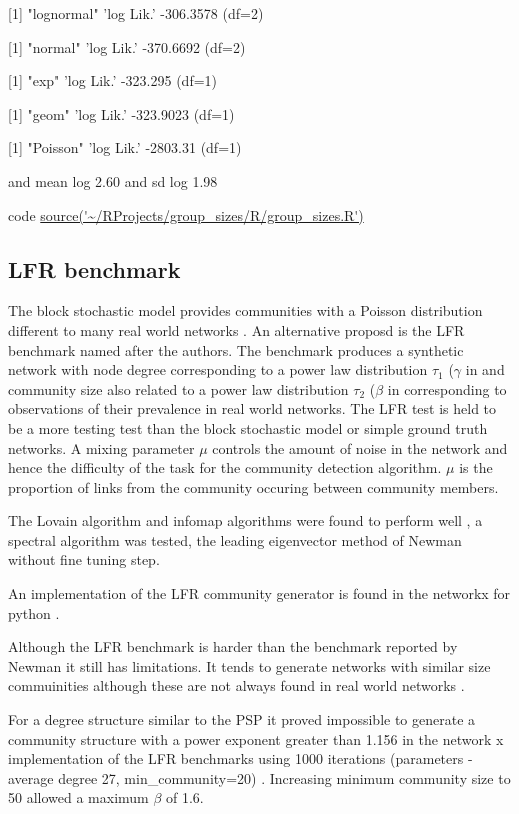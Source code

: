 [1] "lognormal"
'log Lik.' -306.3578 (df=2)

[1] "normal" 
'log Lik.' -370.6692 (df=2)

[1] "exp"
'log Lik.' -323.295 (df=1)

[1] "geom"
'log Lik.' -323.9023 (df=1)

[1] "Poisson"
'log Lik.' -2803.31 (df=1)



and mean log 2.60 and sd log 1.98

code \url{source('~/RProjects/group_sizes/R/group_sizes.R')}
\subsection{LFR benchmark}

The block stochastic model provides communities with a Poisson distribution different to many real world networks . An alternative proposd is the LFR benchmark named after the authors. The benchmark produces a synthetic network with node degree corresponding to a power law distribution $\tau_1$ ($\gamma$ in \cite{lancichinetti2009community} and community size also related to a power law distribution $\tau_2$ ($\beta$ in \cite{lancichinetti2009community} corresponding to observations of their prevalence in real world networks. The LFR test is held to be a more testing test than the block stochastic model or simple ground truth networks. A mixing parameter $\mu$ controls the amount of noise in the network and hence the difficulty of the task for the community detection algorithm. $\mu$ is the proportion of links from the community occuring between community members. 

The Lovain algorithm and infomap algorithms were found to perform well \cite{lancichinetti2008benchmark} \cite{lancichinetti2009community}, a spectral algorithm was tested, the leading eigenvector method of Newman \cite{newman2006finding} without fine tuning step. 

An implementation of the LFR community generator is found in the networkx for python \cite{hagberg2008exploring}.

Although the LFR benchmark is harder than the benchmark reported by Newman it still has limitations. It tends to generate networks with similar size commuinities although these are not always found in real world networks \cite{orman2013towards} \cite{aldecoa2013exploring}. 

For a degree structure similar to the PSP it proved impossible to generate a community structure with a power exponent greater than 1.156 in the network x implementation of the LFR benchmarks using 1000 iterations (parameters - average degree 27, min\_community=20) .  Increasing minimum community size to 50 allowed a maximum $\beta$ of 1.6.

